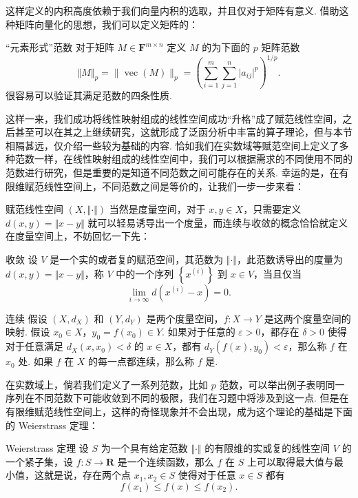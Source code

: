 这样定义的内积高度依赖于我们向量内积的选取，并且仅对于矩阵有意义. 借助这种矩阵向量化的思想，我们可以定义矩阵的：

\begin{definition}{“元素形式”范数}{}
    对于矩阵 $M\in \mathbf{F}^{m\times n}$ 定义 $M$ 的为下面的 $p$ 矩阵范数 \[\Vert M\Vert_p = \lVert \operatorname{vec}(M) \rVert _p = \left(\sum_{i = 1}^{m}\sum_{j = 1}^{n} \vert a_{ij}\vert^p\right)^{1/p}.\]
    很容易可以验证其满足范数的四条性质.
\end{definition}

这样一来，我们成功将线性映射组成的线性空间成功“升格”成了赋范线性空间，之后甚至可以在其之上继续研究，这就形成了泛函分析中丰富的算子理论，但与本节相隔甚远，仅介绍一些较为基础的内容. 恰如我们在实数域等赋范空间上定义了多种范数一样，在线性映射组成的线性空间中，我们可以根据需求的不同使用不同的范数进行研究，但是重要的是知道不同范数之间可能存在的关系. 幸运的是，在有限维赋范线性空间上，不同范数之间是等价的，让我们一步一步来看：

赋范线性空间 $(X, \Vert \cdot \Vert)$ 当然是度量空间，对于 $x, y\in X$，只需要定义 $d(x, y) = \Vert x-y\Vert$ 就可以轻易诱导出一个度量，而连续与收敛的概念恰恰就定义在度量空间上，不妨回忆一下先：

\begin{definition}{收敛}{}
    设 $V$ 是一个实的或者复的赋范空间，其范数为 $\Vert \cdot \Vert$，此范数诱导出的度量为 $d(x, y) = \Vert x - y\Vert$，称 $V$ 中的一个序列 $\left\{x^{(i)}\right\}$ 到 $x\in V$，当且仅当 \[\lim_{i\to\infty}d(x^{(i)} - x) = 0.\]
\end{definition}

\begin{definition}{连续}{}
    假设 $(X,d_X)$ 和 $(Y, d_Y)$ 是两个度量空间，$f\colon X\to Y$ 是这两个度量空间的映射. 假设 $x_0\in X$，$y_0 = f(x_0)\in Y$. 如果对于任意的 $\varepsilon>0$，都存在 $\delta>0$ 使得对于任意满足 $d_X(x, x_0) < \delta$ 的 $x\in X$，都有 $d_Y(f(x), y_0) < \varepsilon$，那么称 $f$ 在 $x_0$ 处. 如果 $f$ 在 $X$ 的每一点都连续，那么称 $f$ 是.
\end{definition}

在实数域上，倘若我们定义了一系列范数，比如 $p$ 范数，可以举出例子表明同一序列在不同范数下可能收敛到不同的极限，我们在习题中将涉及到这一点. 但是在有限维赋范线性空间上，这样的奇怪现象并不会出现，成为这个理论的基础是下面的 Weierstrass 定理：

\begin{theorem}{Weierstrass 定理}{}
    设 $S$ 为一个具有给定范数 $\Vert \cdot \Vert$ 的有限维的实或复的线性空间 $V$ 的一个紧子集，设 $f\colon S\to\mathbf{R}$ 是一个连续函数，那么 $f$ 在 $S$ 上可以取得最大值与最小值，这就是说，存在两个点 $x_1, x_2\in S$ 使得对于任意 $x\in S$ 都有 \[f(x_1)\leqslant f(x)\leqslant f(x_2).\]
\end{theorem}

